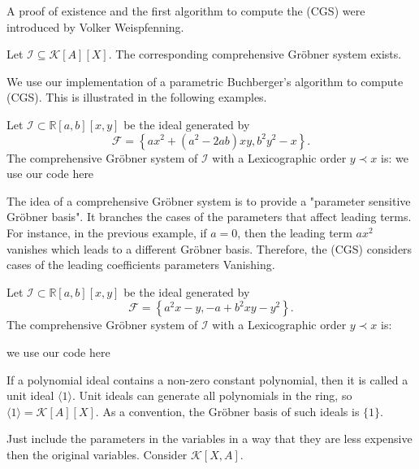 \documentclass[runningheads]{llncs}
\newcommand{\Rr}{\mathbb{R}}
\newcommand{\1}{\chi}
\newcommand{\Ff}{\mathcal{F}}
\newcommand{\Ii}{\mathcal{I}}
\begin{document}
A proof of existence and the first algorithm to compute the (CGS) were introduced by Volker Weispfenning.
\begin{theorem}
    Let $\mathcal{I}\subseteq\mathcal{K}[A][X].$ The corresponding comprehensive Gr{\"o}bner system exists.\cite{weispfenning}
\end{theorem}
We use our implementation of a parametric Buchberger's algorithm to compute (CGS). 
This is illustrated in the following examples.
\begin{example}
    Let $\Ii\subset \Rr[a,b][x,y]$ be the ideal generated by 
    $$\Ff=\left\{a x^2+\left(a^2-2 a b\right) x y, b^2 y^2-x\right\}.$$
    The comprehensive Gr{\"o}bner system of $\Ii$ with a Lexicographic order $y\prec x$ is:
    {\color{red} we use our code here}
\end{example}
The idea of a comprehensive Gr{\"o}bner system is to provide a "parameter sensitive Gr{\"o}bner basis".
It branches the cases of the parameters that affect leading terms. For instance, in the previous
example, if $a=0$, then the leading term $a x^2$ vanishes which leads to a different Gr{\"o}bner basis. Therefore,
the (CGS) considers cases of the leading coefficients parameters Vanishing.

\begin{example}
    Let $\mathcal{I}\subset \Rr[a,b][x,y]$ be the ideal generated by 
    $$\Ff=\left\{a^2 x-y,-a+b^2 x
    y-y^2\right\}.$$
    The comprehensive Gr{\"o}bner system of $\mathcal{I}$ with a Lexicographic order $y\prec x$ is:
    
    {\color{red} we use our code here}
\end{example}


\begin{remark}
    If a polynomial ideal contains a non-zero constant polynomial, then it is called a unit ideal $\langle 1\rangle$.
   Unit ideals can generate all polynomials in the ring, so $\langle 1\rangle=\mathcal{K}[A][X]$.
    As a convention, the Gr{\"o}bner basis of such ideals is $\{1\}$.
\end{remark}

{\color{blue} Just include the parameters in the variables in a way that they are less expensive then the original variables. Consider $\mathcal{K}[X,A]$.}   
\end{document}

